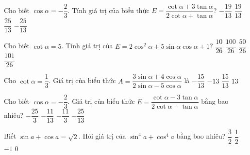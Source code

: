 \begin{ex}%
	Cho biết $\cos\alpha=-\dfrac{2}{3}$. Tính giá trị của biểu thức $E=\dfrac{\cot\alpha+3\tan\alpha}{2\cot\alpha+\tan\alpha}$?
	\choice
	{$-\dfrac{19}{13}$}
	{\True $\dfrac{19}{13}$}
	{$\dfrac{25}{13}$}
	{$-\dfrac{25}{13}$}
\end{ex}
\begin{ex}%
	Cho biết $\cot\alpha=5$. Tính giá trị của $E=2\cos^2\alpha+5\sin\alpha\cos\alpha+1$?
	\choice
	{$\dfrac{10}{26}$}
	{$\dfrac{100}{26}$}
	{$\dfrac{50}{26}$}
	{\True $\dfrac{101}{26}$}
\end{ex}
\begin{ex}%
	Cho $\cot\alpha=\dfrac{1}{3}$. Giá trị của biểu thức $A=\dfrac{3\sin\alpha+4\cos\alpha}{2\sin\alpha-5\cos\alpha}$ là 
	\choice
	{$-\dfrac{15}{13}$}
	{$-13$}
	{$\dfrac{15}{13}$}
	{\True $13$}
\end{ex}
\begin{ex}%
	Cho biết $\cos\alpha=-\dfrac{2}{3}$. Giá trị của biểu thức $E=\dfrac{\cot\alpha-3\tan\alpha}{2\cot\alpha-\tan\alpha}$ bằng bao nhiêu?
	\choice
	{$-\dfrac{25}{3}$}
	{$-\dfrac{11}{13}$}
	{\True $-\dfrac{11}{3}$}
	{$-\dfrac{25}{13}$}
\end{ex}
\begin{ex}%
	Biết $\sin a+\cos a=\sqrt{2}$. Hỏi giá trị của $\sin^4a+\cos^4a$ bằng bao nhiêu?
	\choice
	{$\dfrac{3}{2}$}
	{\True $\dfrac{1}{2}$}
	{$-1$}
	{$0$}
\end{ex}
